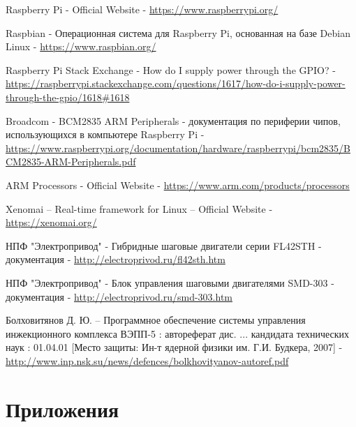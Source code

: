 \documentclass[14pt,russian,a4paper]{extarticle}
\begin{document}
\begin{thebibliography}{99}
Raspberry Pi - Official Website -
\url{https://www.raspberrypi.org/}

Raspbian -
Операционная система для Raspberry Pi, основанная на базе Debian Linux -
\url{https://www.raspbian.org/}

Raspberry Pi Stack Exchange -
How do I supply power through the GPIO? -
\url{https://raspberrypi.stackexchange.com/questions/1617/how-do-i-supply-power-through-the-gpio/1618#1618}

Broadcom -
BCM2835 ARM Peripherals -
документация по периферии чипов, использующихся в компьютере Raspberry Pi -
\url{https://www.raspberrypi.org/documentation/hardware/raspberrypi/bcm2835/BCM2835-ARM-Peripherals.pdf}

ARM Processors -
Official Website -
\url{https://www.arm.com/products/processors}

Xenomai – Real-time framework for Linux –
Official Website -
\url{https://xenomai.org/}

НПФ "Электропривод" -
Гибридные шаговые двигатели серии FL42STH -
документация -
\url{http://electroprivod.ru/fl42sth.htm}

НПФ "Электропривод" -
Блок управления шаговыми двигателями SMD-303 -
документация -
\url{http://electroprivod.ru/smd-303.htm}

Болховитянов Д. Ю. –
Программное обеспечение системы управления инжекционного комплекса ВЭПП-5 :
автореферат дис. ... кандидата технических наук :
01.04.01 [Место защиты: Ин-т ядерной физики им. Г.И. Будкера, 2007] -
\url{http://www.inp.nsk.su/news/defences/bolkhovityanov-autoref.pdf}

\end{thebibliography}

\newpage

\section{Приложения}
\end{document}
